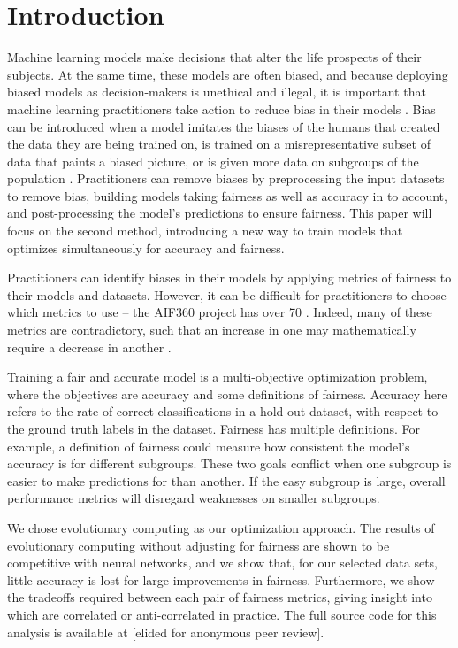 \documentclass[twoside]{article}
\begin{document}
\section{Introduction}

Machine learning models make decisions that alter the life prospects of their subjects. At the same time, these models are often biased, and because deploying biased models as decision-makers is unethical and illegal, it is important that machine learning practitioners take action to reduce bias in their models \citep{Binns:2017}. Bias can be introduced when a model imitates the biases of the humans that created the data they are being trained on, is trained on a misrepresentative subset of data that paints a biased picture, or is given more data on subgroups of the population \citep{Zerbinati:2011}. Practitioners can remove biases by preprocessing the input datasets to remove bias, building models taking fairness as well as accuracy in to account, and post-processing the model’s predictions to ensure fairness. This paper will focus on the second method, introducing a new way to train models that optimizes simultaneously for accuracy and fairness. 

Practitioners can identify biases in their models by applying metrics of fairness to their models and datasets. However, it can be difficult for practitioners to choose which metrics to use – the AIF360 project has over 70 \citep{Bellamy:2018}. Indeed, many of these metrics are contradictory, such that an increase in one may mathematically require a decrease in another \citep{Kleinberg:2016}.

Training a fair and accurate model is a multi-objective optimization problem, where the objectives are accuracy and some definitions of fairness. Accuracy here refers to the rate of correct classifications in a hold-out dataset, with respect to the ground truth labels in the dataset. Fairness has multiple definitions. For example, a definition of fairness could measure how consistent the model’s accuracy is for different subgroups. These two goals conflict when one subgroup is easier to make predictions for than another. If the easy subgroup is large, overall performance metrics will disregard weaknesses on smaller subgroups.

We chose evolutionary computing as our optimization approach. The results of evolutionary computing without adjusting for fairness are shown to be competitive with neural networks, and we show that, for our selected data sets, little accuracy is lost for large improvements in fairness. Furthermore, we show the tradeoffs required between each pair of fairness metrics, giving insight into which are correlated or anti-correlated in practice. The full source code for this analysis is available at [elided for anonymous peer review].
\end{document}
